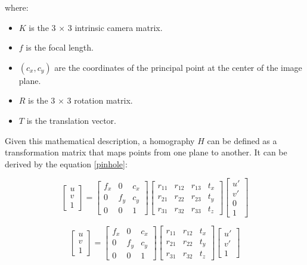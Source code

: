 where:
\begin{itemize}
    \item $K$ is the 3 $\times$ 3 intrinsic camera matrix.
    \item $f$ is the focal length.
    \item $(c_x,c_y)$ are the coordinates of the principal point at the center of the image plane.
    \item $R$ is the 3 $\times$ 3 rotation matrix.
    \item $T$ is the translation vector.
    
\end{itemize}

Given this  mathematical description, a homography $H$ can be defined as a transformation matrix that maps points from one plane to another. It can be derived by the equation \ref{pinhole}:

\begin{equation}
    \begin{bmatrix} u\\ v\\ 1 \end{bmatrix} = \begin{bmatrix}
        f_x & 0   & c_x\\ 
        0   & f_y & c_y \\ 
        0   & 0   & 1 
        \end{bmatrix}
        \begin{bmatrix}
        r_{11}& r_{12} & r_{13} & t_{x} \\ 
        r_{21}& r_{22} & r_{23} & t_{y} \\
        r_{31}& r_{32} & r_{33} & t_{z}
        \end{bmatrix}
        \begin{bmatrix} u'\\ v'\\ 0 \\ 1 \end{bmatrix}
\end{equation}

\begin{equation}
    \begin{bmatrix} u\\ v\\ 1 \end{bmatrix} = \begin{bmatrix}
        f_x & 0   & c_x\\ 
        0   & f_y & c_y \\ 
        0   & 0   & 1 
        \end{bmatrix}
        \begin{bmatrix}
        r_{11}& r_{12} & t_{x} \\ 
        r_{21}& r_{22} & t_{y} \\
        r_{31}& r_{32} & t_{z}
        \end{bmatrix}
        \begin{bmatrix} u'\\ v'\\ 1 \end{bmatrix}
\end{equation}

